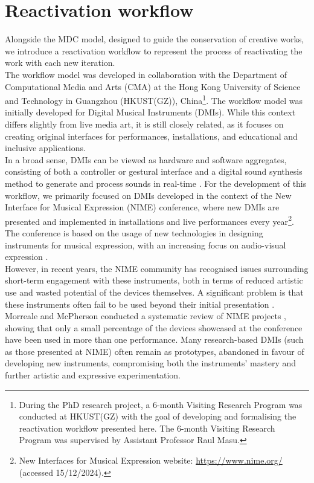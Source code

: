 \section{Reactivation workflow}
Alongside the MDC model, designed to guide the conservation of creative works, we introduce a reactivation workflow to represent the process of reactivating the work with each new iteration.\\
The workflow model was developed in collaboration with the Department of Computational Media and Arts (CMA) at the Hong Kong University of Science and Technology in Guangzhou (HKUST(GZ)), China\footnote{During the PhD research project, a 6-month Visiting Research Program was conducted at HKUST(GZ) with the goal of developing and formalising the reactivation workflow presented here. The 6-month Visiting Research Program was supervised by Assistant Professor Raul Masu.}. The workflow model was initially developed for Digital Musical Instruments (DMIs). While this context differs slightly from live media art, it is still closely related, as it focuses on creating original interfaces for performances, installations, and educational and inclusive applications.\\
In a broad sense, DMIs can be viewed as hardware and software aggregates, consisting of both a controller or gestural interface and a digital sound synthesis method to generate and process sounds in real-time \cite{miranda2006new}. For the development of this workflow, we primarily focused on DMIs developed in the context of the New Interface for Musical Expression (NIME) conference, where new DMIs are presented and implemented in installations and live performances every year\footnote{New Interfaces for Musical Expression website: \url{https://www.nime.org/} (accessed 15/12/2024).}. The conference is based on the usage of new technologies in designing instruments for musical expression, with an increasing focus on audio-visual expression \cite{jensenius2017nime}.\\
However, in recent years, the NIME community has recognised issues surrounding short-term engagement with these instruments, both in terms of reduced artistic use and wasted potential of the devices themselves. A significant problem is that these instruments often fail to be used beyond their initial presentation \cite{mamedes2014nime}. Morreale and McPherson conducted a systematic review of NIME projects \cite{morreale2017nime}, showing that only a small percentage of the devices showcased at the conference have been used in more than one performance. Many research-based DMIs (such as those presented at NIME) often remain as prototypes, abandoned in favour of developing new instruments, compromising both the instruments' mastery and further artistic and expressive experimentation.\\
